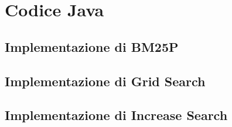 \chapter{Codice Java}

\section{Implementazione di BM25P}



\section{Implementazione di Grid Search}



\section{Implementazione di Increase Search}

